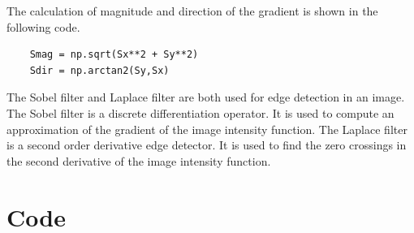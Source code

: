 \documentclass[12pt
,headinclude
,headsepline
,bibtotocnumbered
]{scrartcl}
\begin{document}
The calculation of magnitude and direction of the gradient is shown in the following code.
\begin{lstlisting}
    Smag = np.sqrt(Sx**2 + Sy**2)
    Sdir = np.arctan2(Sy,Sx)
\end{lstlisting}
The Sobel filter and Laplace filter are both used for edge detection in an image. The Sobel filter is a discrete differentiation operator. It is used to compute an approximation of the gradient of the image intensity function. The Laplace filter is a second order derivative edge detector. It is used to find the zero crossings in the second derivative of the image intensity function.  
\newpage
\section*{Code}


\end{document}
